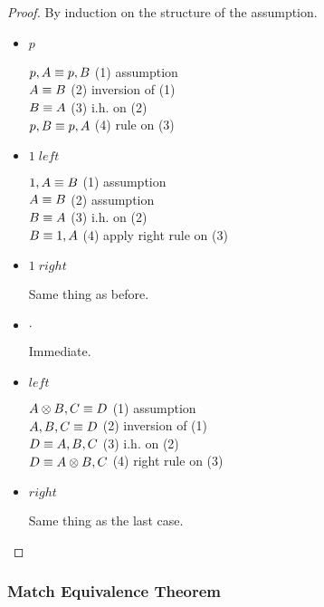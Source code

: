 \begin{proof}
   By induction on the structure of the assumption.
   
   \begin{itemize}
      \item $p$
      
      $p, A \equiv p, B$ \hfill (1) assumption \\
      $A \equiv B$ \hfill (2) inversion of (1) \\
      $B \equiv A$ \hfill (3) i.h. on (2) \\
      $p, B \equiv p, A$ \hfill (4) rule on (3) \\
      
      \item $1 \; left$
      
      $1, A \equiv B$ \hfill (1) assumption \\
      $A \equiv B$ \hfill (2) assumption \\
      $B \equiv A$ \hfill (3) i.h. on (2) \\
      $B \equiv 1, A$ \hfill (4) apply right rule on (3) \\
      
      \item $1 \; right$
      
      Same thing as before.
      
      \item $\cdot$

      Immediate.

      \item $left$

      $A \otimes B, C \equiv D$ \hfill (1) assumption \\
      $A, B, C \equiv D$ \hfill (2) inversion of (1) \\
      $D \equiv A, B, C$ \hfill (3) i.h. on (2) \\
      $D \equiv A \otimes B, C$ \hfill (4) right rule on (3) \\

      \item $right$

      Same thing as the last case.
   \end{itemize}
\end{proof}

\subsubsection{Match Equivalence Theorem}

